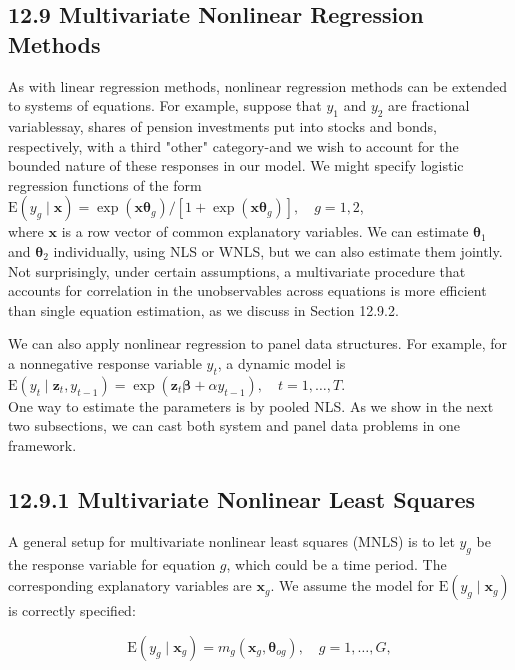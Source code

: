 \documentclass[10pt]{article}
\begin{document}
\subsection*{12.9 Multivariate Nonlinear Regression Methods}
As with linear regression methods, nonlinear regression methods can be extended to systems of equations. For example, suppose that $y_{1}$ and $y_{2}$ are fractional variablessay, shares of pension investments put into stocks and bonds, respectively, with a third "other" category-and we wish to account for the bounded nature of these responses in our model. We might specify logistic regression functions of the form\\
$\mathrm{E}\left(y_{g} \mid \mathbf{x}\right)=\exp \left(\mathbf{x} \boldsymbol{\theta}_{g}\right) /\left[1+\exp \left(\mathbf{x} \boldsymbol{\theta}_{g}\right)\right], \quad g=1,2$,\\
where $\mathbf{x}$ is a row vector of common explanatory variables. We can estimate $\boldsymbol{\theta}_{1}$ and $\boldsymbol{\theta}_{2}$ individually, using NLS or WNLS, but we can also estimate them jointly. Not surprisingly, under certain assumptions, a multivariate procedure that accounts for correlation in the unobservables across equations is more efficient than single equation estimation, as we discuss in Section 12.9.2.

We can also apply nonlinear regression to panel data structures. For example, for a nonnegative response variable $y_{t}$, a dynamic model is\\
$\mathrm{E}\left(y_{t} \mid \mathbf{z}_{t}, y_{t-1}\right)=\exp \left(\mathbf{z}_{t} \boldsymbol{\beta}+\alpha y_{t-1}\right), \quad t=1, \ldots, T$.\\
One way to estimate the parameters is by pooled NLS. As we show in the next two subsections, we can cast both system and panel data problems in one framework.

\subsection*{12.9.1 Multivariate Nonlinear Least Squares}
A general setup for multivariate nonlinear least squares (MNLS) is to let $y_{g}$ be the response variable for equation $g$, which could be a time period. The corresponding explanatory variables are $\mathbf{x}_{g}$. We assume the model for $\mathrm{E}\left(y_{g} \mid \mathbf{x}_{g}\right)$ is correctly specified:


\begin{equation*}
\mathrm{E}\left(y_{g} \mid \mathbf{x}_{g}\right)=m_{g}\left(\mathbf{x}_{g}, \boldsymbol{\theta}_{o g}\right), \quad g=1, \ldots, G, \tag{12.90}
\end{equation*}
\end{document}
